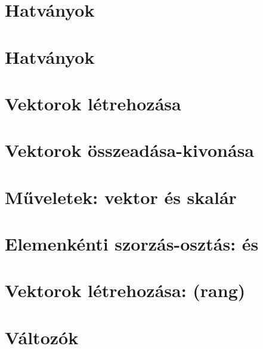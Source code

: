 \begin{spacing}{1.2}
\section*{Hatványok} \label{DBmatlabia5}
\Fa{

}
\vspace{0.5cm}
\newpage
\section*{Hatványok} \label{DBmatlabia5Mo}
\Mo{

}
\vspace{0.5cm}
\newpage
\section*{Vektorok létrehozása} \label{DBmatlabia6}
\Desc{

}
\vspace{0.5cm}
\newpage
\section*{Vektorok összeadása-kivonása} \label{DBmatlabia6s}
\Desc{

}
\vspace{0.5cm}
\newpage
\section*{Műveletek: vektor és skalár} \label{DBmatlabia7}
\Desc{

}
\vspace{0.5cm}
\newpage
\section*{Elemenkénti szorzás-osztás:  és } \label{DBmatlabia8}
\Desc{

}
\vspace{0.5cm}
\newpage
\section*{Vektorok létrehozása: \mcode{:} (rang)} \label{DBmatlabia9}
\Desc{

}
\vspace{0.5cm}
\newpage
\section*{Változók} \label{DBmatlabia10}
\Desc{

}
\vspace{0.5cm}
\newpage

\end{spacing}
